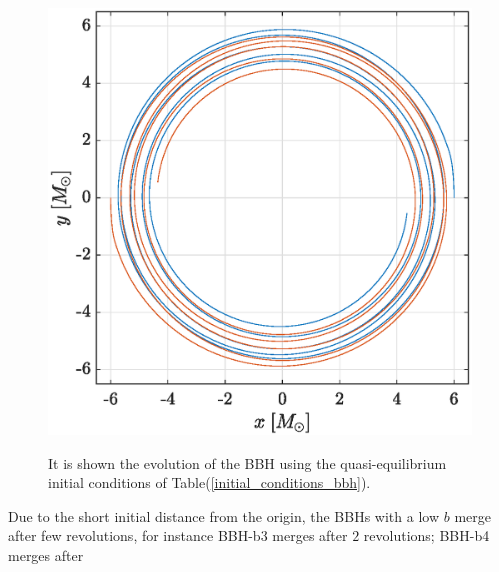 \begin{figure}
   {\includegraphics[width=.45\textwidth]{numerical_evolution/trajectory_b6.eps}
   \label{trajectory_b6}} \quad
{} \quad
{} \quad
 \\
\caption{It is shown the evolution of the BBH using the quasi-equilibrium initial conditions of Table(\ref{initial_conditions_bbh}).}
\label{orbits}
\end{figure}
Due to the short initial distance from the origin, the BBHs with a low $b$ merge after few revolutions, for instance BBH-b3 merges after $2$ revolutions; BBH-b4 merges after
